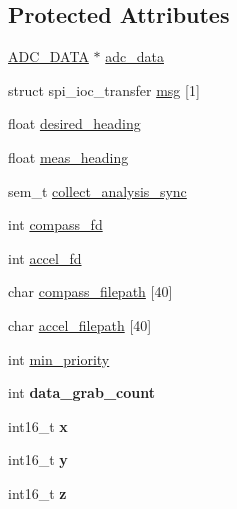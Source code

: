 \subsection*{Protected Attributes}
\begin{DoxyCompactItemize}
\item 
\hyperlink{SUBSYS__COMMANDS_8h_a0be7f6e3de248ca3bdb1f3f5a0819c62}{A\-D\-C\-\_\-\-D\-A\-T\-A} $\ast$ \hyperlink{classCompass_a72a3d0e853685bdbc6758120ebd10800}{adc\-\_\-data}
\item 
struct spi\-\_\-ioc\-\_\-transfer \hyperlink{classCompass_aed40464cb0c9203d87ab8a9127cc9080}{msg} \mbox{[}1\mbox{]}
\item 
float \hyperlink{classCompass_ac888a4dacdc477e53c99fe8e110966ae}{desired\-\_\-heading}
\item 
float \hyperlink{classCompass_af0f87a131e2c9833f7d52bed1a39bf75}{meas\-\_\-heading}
\item 
sem\-\_\-t \hyperlink{classCompass_ace6e13b91461366609f093fef09188d9}{collect\-\_\-analysis\-\_\-sync}
\item 
int \hyperlink{classCompass_a44b0e4223918e3b139e54d54a0e3daad}{compass\-\_\-fd}
\item 
int \hyperlink{classCompass_a2a55ab6b29ea9ddca507a948cb30d42b}{accel\-\_\-fd}
\item 
char \hyperlink{classCompass_a6ff33d93efe79539c75dbee45efdc97c}{compass\-\_\-filepath} \mbox{[}40\mbox{]}
\item 
char \hyperlink{classCompass_a69f89e1a0d7c769e02cd3704904e40fd}{accel\-\_\-filepath} \mbox{[}40\mbox{]}
\item 
int \hyperlink{classCompass_a90f2dea7249c85f22c5bc45ed9d86b57}{min\-\_\-priority}
\item 
\hypertarget{classCompass_a08a0c0243b0c0dbfef446b7cdc6171a5}{int {\bfseries data\-\_\-grab\-\_\-count}}\label{classCompass_a08a0c0243b0c0dbfef446b7cdc6171a5}

\item 
\hypertarget{classCompass_ae19b46ed0c752445d27175c2205e2d6e}{int16\-\_\-t {\bfseries x}}\label{classCompass_ae19b46ed0c752445d27175c2205e2d6e}

\item 
\hypertarget{classCompass_a92ae0ec7df5da4f682653edc59a3902e}{int16\-\_\-t {\bfseries y}}\label{classCompass_a92ae0ec7df5da4f682653edc59a3902e}

\item 
\hypertarget{classCompass_ad69ac341e3d3e3c956658bb847f271d5}{int16\-\_\-t {\bfseries z}}\label{classCompass_ad69ac341e3d3e3c956658bb847f271d5}


\end{DoxyCompactItemize}
